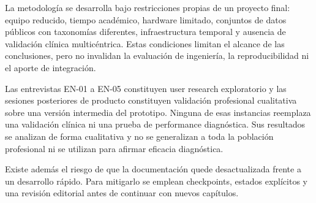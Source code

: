 La metodología se desarrolla bajo restricciones propias de un proyecto final: equipo reducido, tiempo académico, hardware limitado, conjuntos de datos públicos con taxonomías diferentes, infraestructura temporal y ausencia de validación clínica multicéntrica. Estas condiciones limitan el alcance de las conclusiones, pero no invalidan la evaluación de ingeniería, la reproducibilidad ni el aporte de integración.

Las entrevistas EN-01 a EN-05 constituyen user research exploratorio y las sesiones posteriores de producto constituyen validación profesional cualitativa sobre una versión intermedia del prototipo. Ninguna de esas instancias reemplaza una validación clínica ni una prueba de performance diagnóstica. Sus resultados se analizan de forma cualitativa y no se generalizan a toda la población profesional ni se utilizan para afirmar eficacia diagnóstica.

Existe además el riesgo de que la documentación quede desactualizada frente a un desarrollo rápido. Para mitigarlo se emplean checkpoints, estados explícitos y una revisión editorial antes de continuar con nuevos capítulos.
